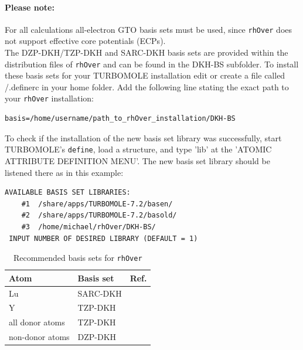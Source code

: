 \documentclass[11pt]{article}
\begin{document}
\paragraph{Please note:} For all calculations all-electron GTO basis sets must be used, since \texttt{rhOver} does not support effective core potentials (ECPs). \\

\noindent
The DZP-DKH/TZP-DKH\cite{Jorge2009} and SARC-DKH\cite{Pantazis2009} basis sets are provided within the distribution files of \texttt{rhOver} and can be found in the DKH-BS subfolder.
To install these basis sets for your TURBOMOLE installation edit or create a file called \texttildelow/.definerc in your home folder.
Add the following line stating the exact path to your \texttt{rhOver} installation:

\begin{lstlisting}[frame=single,backgroundcolor=\color{bash},emph={username,path_to_rhOver_installation},emphstyle={\itshape}]
 basis=/home/username/path_to_rhOver_installation/DKH-BS
\end{lstlisting} 

\noindent
To check if the installation of the new basis set library was successfully, start TURBOMOLE's \texttt{define}, load a structure, and type 'lib' at the 'ATOMIC ATTRIBUTE DEFINITION MENU'. The new basis set library should be listened there as in this example:

\begin{lstlisting}[frame=single,backgroundcolor=\color{bash}]
 AVAILABLE BASIS SET LIBRARIES:
    #1  /share/apps/TURBOMOLE-7.2/basen/
    #2  /share/apps/TURBOMOLE-7.2/basold/
    #3  /home/michael/rhOver/DKH-BS/
 INPUT NUMBER OF DESIRED LIBRARY (DEFAULT = 1)
\end{lstlisting}

\begin{table}[h!]
 \centering
 \caption{Recommended basis sets for \texttt{rhOver}}
 \label{tab:targets}
  \begin{tabular}{lll}
   \toprule
    Atom                     & Basis set & Ref. \\
   \midrule
    Lu                       & SARC-DKH  & \cite{Pantazis2009} \\
    Y                        & TZP-DKH   & \cite{Jorge2009} \\
    all donor atoms          & TZP-DKH   & \cite{Jorge2009} \\
    non-donor atoms          & DZP-DKH   & \cite{Jorge2009} \\
   \bottomrule
  \end{tabular}
\end{table}
\end{document}

